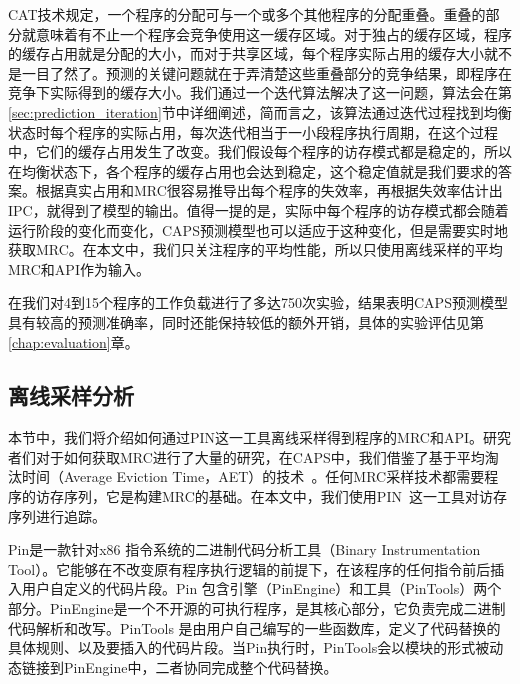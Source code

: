CAT技术规定，一个程序的分配可与一个或多个其他程序的分配重叠。重叠的部分就意味着有不止一个程序会竞争使用这一缓存区域。对于独占的缓存区域，程序的缓存占用就是分配的大小，而对于共享区域，每个程序实际占用的缓存大小就不是一目了然了。预测的关键问题就在于弄清楚这些重叠部分的竞争结果，即程序在竞争下实际得到的缓存大小。我们通过一个迭代算法解决了这一问题，算法会在第\ref{sec:prediction_iteration}节中详细阐述，简而言之，该算法通过迭代过程找到均衡状态时每个程序的实际占用，每次迭代相当于一小段程序执行周期，在这个过程中，它们的缓存占用发生了改变。我们假设每个程序的访存模式都是稳定的，所以在均衡状态下，各个程序的缓存占用也会达到稳定，这个稳定值就是我们要求的答案。根据真实占用和MRC很容易推导出每个程序的失效率，再根据失效率估计出IPC，就得到了模型的输出。值得一提的是，实际中每个程序的访存模式都会随着运行阶段的变化而变化，CAPS预测模型也可以适应于这种变化，但是需要实时地获取MRC。在本文中，我们只关注程序的平均性能，所以只使用离线采样的平均MRC和API作为输入。

在我们对4到15个程序的工作负载进行了多达750次实验，结果表明CAPS预测模型具有较高的预测准确率，同时还能保持较低的额外开销，具体的实验评估见第\ref{chap:evaluation}章。


\subsection{离线采样分析} \label{sec:prediction_sample}
本节中，我们将介绍如何通过PIN这一工具离线采样得到程序的MRC和API。研究者们对于如何获取MRC进行了大量的研究，在CAPS中，我们借鉴了基于平均淘汰时间（Average Eviction Time，AET）的技术~\parencite{hu2016kinect}。任何MRC采样技术都需要程序的访存序列，它是构建MRC的基础。在本文中，我们使用PIN~\parencite{luk2005pin}这一工具对访存序列进行追踪。

Pin是一款针对x86 指令系统的二进制代码分析工具（Binary Instrumentation Tool）。它能够在不改变原有程序执行逻辑的前提下，在该程序的任何指令前后插入用户自定义的代码片段。Pin 包含引擎（PinEngine）和工具（PinTools）两个部分。PinEngine是一个不开源的可执行程序，是其核心部分，它负责完成二进制代码解析和改写。PinTools 是由用户自己编写的一些函数库，定义了代码替换的具体规则、以及要插入的代码片段。当Pin执行时，PinTools会以模块的形式被动态链接到PinEngine中，二者协同完成整个代码替换。

